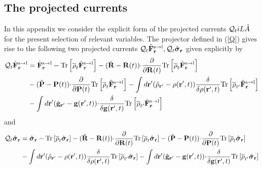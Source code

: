\documentclass[b5paper,openright,11pt]{book}
\begin{document}
\begin{appendices}
\chapter{The projected currents}
\label{Ap:Projected}
In  this appendix  we  consider  the explicit  form  of the  projected
currents  ${\cal  Q}_tiL\hat{A}$  for  the  present  selection  of  relevant
variables.   The projector  defined  in (\ref{Q})  gives  rise to  the
following  two projected  currents  ${\cal  Q}_t\hat{\bf F}^{\rm  s\to
  l}_{{\bf r}},  {\cal Q}_t\hat{\boldsymbol{\sigma}}_{{\bf  r}}$ given
explicitly by
\begin{align}
  {\cal Q}_t\hat{\bf F}^{\rm s\to l}_{{\bf r}}&=
\hat{\bf F}^{\rm s\to l}_{{\bf r}}- {\rm Tr}\left[\overline{\rho}_{t} \hat{\bf F}^{\rm s\to l}_{{\bf r}}\right]
-(\hat{\bf R}-{\bf R}(t)){\cdot}\frac{\partial}{\partial {\bf R}(t)}
{\rm Tr}\left[\overline{\rho}_{t} \hat{\bf F}^{\rm s\to l}_{{\bf r}}\right]
\nonumber \\
&-(\hat{\bf P}-{\bf P}(t)){\cdot}\frac{\partial}{\partial {\bf P}(t)}
{\rm Tr}\left[\overline{\rho}_{t} \hat{\bf F}^{\rm s\to l}_{{\bf r}}\right]
-\int d{\bf r}'(\hat{\rho}_{{\bf r}'}-\rho({\bf r}',t))
\frac{\delta}{\delta \rho({\bf r}',t)}{\rm Tr}\left[\overline{\rho}_{t'}  \hat{\bf F}^{\rm s\to l}_{{\bf r}}\right]
\nonumber\\
&-\int d{\bf r}'(\hat{\bf g}_{{\bf r}'}-{\bf g}({\bf r}',t))
{\cdot}\frac{\delta}{\delta {\bf g}({\bf r}',t)}{\rm Tr}\left[\overline{\rho}_{t'}  \hat{\bf F}^{\rm s\to l}_{{\bf r}}\right]
\label{QF0}
\end{align}
and 
\begin{align}
  {\cal Q}_t\hat{\boldsymbol{\sigma}}_{{\bf r}}&=
\hat{\boldsymbol{\sigma}}_{{\bf r}}- {\rm Tr}\left[\overline{\rho}_{t} \hat{\boldsymbol{\sigma}}_{{\bf r}}\right]
-(\hat{\bf R}-{\bf R}(t)){\cdot}\frac{\partial}{\partial {\bf R}(t)}
{\rm Tr}\left[\overline{\rho}_{t} \hat{\boldsymbol{\sigma}}_{{\bf r}}\right]
-(\hat{\bf P}-{\bf P}(t)){\cdot}\frac{\partial}{\partial {\bf P}(t)}
{\rm Tr}\left[\overline{\rho}_{t} \hat{\boldsymbol{\sigma}}_{{\bf r}}\right]
\nonumber\\
&-\int d{\bf r}'(\hat{\rho}_{{\bf r}'}-\rho({\bf r}',t))
\frac{\delta}{\delta \rho({\bf r}',t)}{\rm Tr}\left[\overline{\rho}_{t'}\hat{\boldsymbol{\sigma}}_{{\bf r}}\right]
-\int d{\bf r}'(\hat{\bf g}_{{\bf r}'}-{\bf g}({\bf r}',t))
{\cdot}\frac{\delta}{\delta {\bf g}({\bf r}',t)}{\rm Tr}\left[\overline{\rho}_{t'}  \hat{\boldsymbol{\sigma}}_{{\bf r}}\right]
\label{QS0}
\end{align}

\end{appendices}
\end{document}
